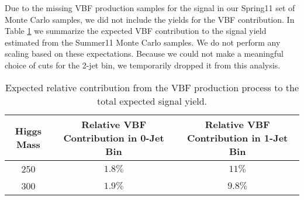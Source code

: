 Due to the missing VBF production samples for the signal in our Spring11 set of 
Monte Carlo samples,  we did not include the yields for the VBF contribution. 
In Table \ref{tab:VBFSignalContribution} we summarize the expected VBF contribution to the signal yield
estimated from the Summer11 Monte Carlo samples.
We do not perform any scaling based on these expectations.
Because we could not make a meaningful choice of cuts for the 2-jet bin,
we temporarily dropped it from this analysis.

\begin{table}[!ht]
\begin{center}
\begin{tabular}{|c|c|c|}
\hline
Higgs Mass        & Relative VBF Contribution in 0-Jet Bin & Relative VBF Contribution in 1-Jet Bin \\ 
\hline 
250               & $1.8\%$                                & $11\%$                                 \\ 
300               & $1.9\%$                                & $9.8\%$                                \\ 
\hline 
\end{tabular}
\caption{Expected relative contribution from the VBF production process to the total
expected signal yield.}
\label{tab:VBFSignalContribution}
\end{center}
\end{table}






